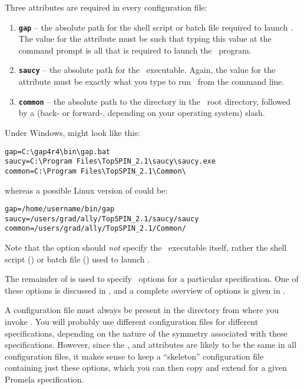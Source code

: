 \noindent Three attributes are required in every configuration file:

\vspace{2mm}
\begin{enumerate}
\item {\bf \texttt{gap}} -- the absolute path for the shell script or batch file
required to launch \gap.  The value for
the  attribute must be such that typing this value at
the command prompt is all that is required to launch the \gap\
program.
\item {\bf \texttt{saucy}}  -- the absolute path for the \saucy\ executable.  Again, the
value for the \inline{saucy} attribute must be exactly what you type
to run \saucy\ from the command line.
\item {\bf \texttt{common}} -- the absolute path to the  directory in
the \topspin\ root directory, followed by a (back- or forward-,
depending on your operating system) slash.
\end{enumerate}
%
Under Windows,  might look like this:
%
\begin{lstlisting}
gap=C:\gap4r4\bin\gap.bat
saucy=C:\Program Files\TopSPIN_2.1\saucy\saucy.exe
common=C:\Program Files\TopSPIN_2.1\Common\
\end{lstlisting}
%
whereas a possible Linux version of  could be:
%
\begin{lstlisting}
gap=/home/username/bin/gap
saucy=/users/grad/ally/TopSPIN_2.1/saucy/saucy
common=/users/grad/ally/TopSPIN_2.1/Common/
\end{lstlisting}
%
Note that the  option should \emph{not} specify the
\gap\ executable itself, rather the shell script ()
or batch file (\inline{gap.bat}) used to launch \gap.

The remainder of  is used to specify \topspin\
options for a particular specification.  One of these options is
discussed in , and a complete overview of
options is given in \chapref{overview}.

A configuration file must always be present in the directory from
where you invoke \topspin.  You will probably use different
configuration files for different specifications, depending on the
nature of the symmetry associated with these specifications.
However, since the \inline{gap}, \inline{saucy} and 
attributes are likely to be the same in all configuration files, it
makes sense to keep a ``skeleton'' configuration file containing
just these options, which you can then copy and extend for a given
Promela specification.

